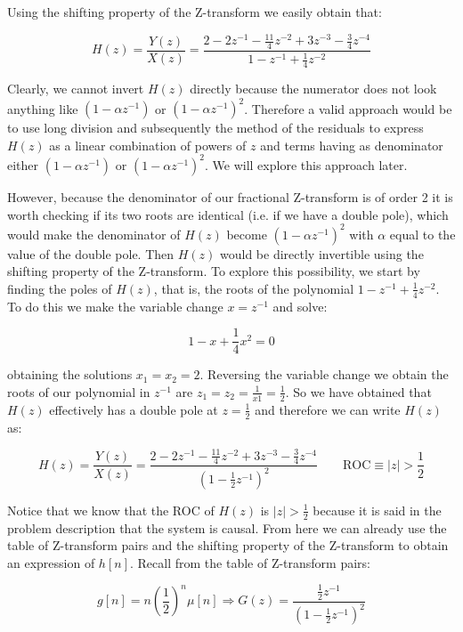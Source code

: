 \documentclass[a4paper,11pt,oneside]{article}
\begin{document}
Using the shifting property of the Z-transform we easily obtain that:

\begin{equation}\label{hz}
H(z)=\frac{Y(z)}{X(z)}=\frac{2-2z^{-1}-\frac{11}{4}z^{-2}+3z^{-3}-\frac{3}{4}z^{-4}}{1-z^{-1}+\frac{1}{4}z^{-2}}
\end{equation}

Clearly, we cannot invert $H(z)$ directly because the numerator does not look anything like $(1-\alpha z^{-1})$ or $(1-\alpha z^{-1})^2$. Therefore a valid approach would be to use long division and subsequently the method of the residuals to express $H(z)$ as a linear combination of powers of $z$ and terms having as denominator either $(1-\alpha z^{-1})$ or $(1-\alpha z^{-1})^2$. We will explore this approach later. 

However, because the denominator of our fractional Z-transform is of order 2 it is worth checking if its two roots are identical (i.e. if we have a double pole), which would make the denominator of $H(z)$ become $(1-\alpha z^{-1})^2$ with $\alpha$ equal to the value of the double pole. Then $H(z)$ would be directly invertible using the shifting property of the Z-transform. To explore this possibility, we start by finding the poles of $H(z)$, that is, the roots of the polynomial $1-z^{-1}+\frac{1}{4}z^{-2}$. To do this we make the variable change $x=z^{-1}$ and solve:

\[
1-x+\frac{1}{4}x^{2}=0
\]

obtaining the solutions $x_1=x_2=2$. Reversing the variable change we obtain the roots of our polynomial in $z^{-1}$ are $z_1=z_2=\frac{1}{x1}=\frac{1}{2}$. So we have obtained that $H(z)$ effectively has a double pole at $z=\frac{1}{2}$ and therefore we can write $H(z)$ as:

\begin{equation}\label{eq:hz}
H(z)=\frac{Y(z)}{X(z)}=\frac{2-2z^{-1}-\frac{11}{4}z^{-2}+3z^{-3}-\frac{3}{4}z^{-4}}{(1-\frac{1}{2}z^{-1})^2} \qquad \textrm{ROC}\equiv |z|>\frac{1}{2}
\end{equation}

Notice that we know that the ROC of $H(z)$ is $|z|>\frac{1}{2}$ because it is said in the problem description that the system is causal. From here we can already use the table of Z-transform pairs and the shifting property of the Z-transform to obtain an expression of $h[n]$. Recall from the table of Z-transform pairs:

\begin{equation}
g[n] = n\left(\frac{1}{2}\right)^n\mu[n] \Rightarrow G(z)=\frac{\frac{1}{2}z^{-1}}{(1-\frac{1}{2}z^{-1})^2}
\end{equation}
\end{document}
